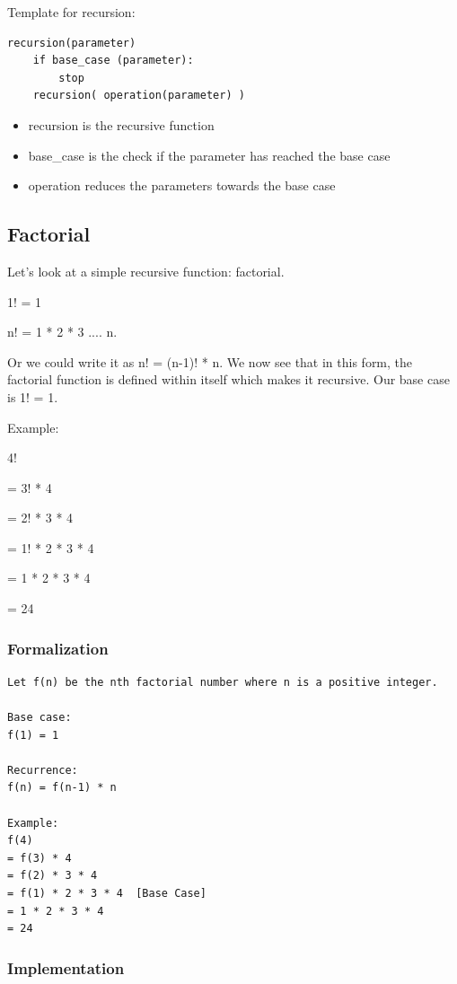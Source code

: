 \documentclass[11pt,oneside]{book}
\begin{document}
Template for recursion:

\begin{lstlisting}
recursion(parameter)
    if base_case (parameter):
        stop
    recursion( operation(parameter) )
\end{lstlisting}

\begin{itemize}
\item recursion is the recursive function
\item base\_case is the check if the parameter has reached the base case
\item operation reduces the parameters towards the base case
\end{itemize}

\subsection{Factorial}

Let's look at a simple recursive function: factorial.

1! = 1

n! = 1 * 2 * 3 .... n.

Or we could write it as n! = (n-1)! * n. We now see that in this form, the factorial function is defined within itself which makes it recursive. Our base case is 1! = 1.

Example:

4!

= 3! * 4

= 2! * 3 * 4

= 1! * 2 * 3 * 4

= 1 * 2 * 3 * 4

= 24

\subsubsection{Formalization}

\begin{lstlisting}
Let f(n) be the nth factorial number where n is a positive integer.

Base case:
f(1) = 1

Recurrence:
f(n) = f(n-1) * n

Example:
f(4) 
= f(3) * 4
= f(2) * 3 * 4
= f(1) * 2 * 3 * 4  [Base Case]
= 1 * 2 * 3 * 4
= 24
\end{lstlisting}

\subsubsection{Implementation}
\end{document}
